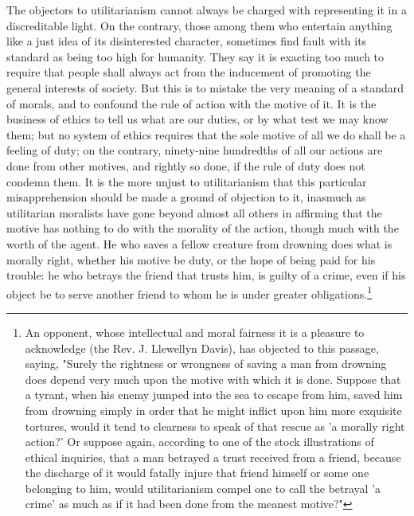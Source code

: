 \documentclass[12pt]{report}
\begin{document}
The objectors to utilitarianism cannot always be charged with representing it in a discreditable light. On the contrary, those among them who entertain anything like a just idea of its disinterested character, sometimes find fault with its standard as being too high for humanity. They say it is exacting too much to require that people shall always act from the inducement of promoting the general interests of society. But this is to mistake the very meaning of a standard of morals, and to confound the rule of action with the motive of it. It is the business of ethics to tell us what are our duties, or by what test we may know them; but no system of ethics requires that the sole motive of all we do shall be a feeling of duty; on the contrary, ninety-nine hundredths of all our actions are done from other motives, and rightly so done, if the rule of duty does not condemn them. It is the more unjust to utilitarianism that this particular misapprehension should be made a ground of objection to it, inasmuch as utilitarian moralists have gone beyond almost all others in affirming that the motive has nothing to do with the morality of the action, though much with the worth of the agent. He who saves a fellow creature from drowning does what is morally right, whether his motive be duty, or the hope of being paid for his trouble: he who betrays the friend that trusts him, is guilty of a crime, even if his object be to serve another friend to whom he is under greater obligations.\footnote{An opponent, whose intellectual and moral fairness it is a pleasure to acknowledge (the Rev. J. Llewellyn Davis), has objected to this passage, saying, "Surely the rightness or wrongness of saving a man from drowning does depend very much upon the motive with which it is done. Suppose that a tyrant, when his enemy jumped into the sea to escape from him, saved him from drowning simply in order that he might inflict upon him more exquisite tortures, would it tend to clearness to speak of that rescue as 'a morally right action?' Or suppose again, according to one of the stock illustrations of ethical inquiries, that a man betrayed a trust received from a friend, because the discharge of it would fatally injure that friend himself or some one belonging to him, would utilitarianism compel one to call the betrayal 'a crime' as much as if it had been done from the meanest motive?"

}
\end{document}
